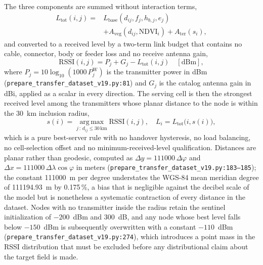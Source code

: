 The three components are summed without interaction terms,
\begin{equation}
\begin{split}
L_{\mathrm{tot}}(i,j) = {}& L_{\mathrm{base}}(d_{ij}, f_{j}, h_{b,j}, e_{j}) \\
 & + A_{\mathrm{veg}}(d_{ij}, \mathrm{NDVI}_{i})
   + A_{\mathrm{ter}}(s_{i}) ,
\end{split}
\label{eq:app-ltot}
\end{equation}
and converted to a received level by a two-term link budget that contains
no cable, connector, body or feeder loss and no receive antenna gain,
\begin{equation}
\mathrm{RSSI}(i,j) = P_{j} + G_{j} - L_{\mathrm{tot}}(i,j)
\quad [\mathrm{dBm}] ,
\label{eq:app-rssi}
\end{equation}
where $P_{j}=10\log_{10}(1000\,P_{j}^{\mathrm{W}})$ is the transmitter power
in dBm (\texttt{prepare\_\allowbreak{}transfer\_\allowbreak{}dataset\_\allowbreak{}v19.py:\allowbreak{}81}) and $G_{j}$ is the
catalog antenna gain in dBi, applied as a scalar in every direction. The
serving cell is then the strongest received level among the transmitters
whose planar distance to the node is within the 30~km inclusion radius,
\begin{equation}
s(i) = \!\!\operatorname*{arg\,max}_{j \,:\, d_{ij} \le 30\,\mathrm{km}}\!\!
\mathrm{RSSI}(i,j),
\quad
L_{i} = L_{\mathrm{tot}}\bigl(i, s(i)\bigr) ,
\label{eq:app-serving}
\end{equation}
which is a pure best-server rule with no handover hysteresis, no load
balancing, no cell-selection offset and no minimum-received-level
qualification. Distances are planar rather than geodesic, computed as
$\Delta y = 111000\,\Delta\varphi$ and
$\Delta x = 111000\,\Delta\lambda\cos\varphi$ in meters
(\texttt{prepare\_\allowbreak{}transfer\_\allowbreak{}dataset\_\allowbreak{}v19.py:\allowbreak{}183--185}); the constant
111000~m per degree understates the WGS-84 mean meridian degree of
111194.93~m by 0.175\,\%, a bias that is negligible against the decibel
scale of the model but is nonetheless a systematic contraction of every
distance in the dataset. Nodes with no transmitter inside the radius retain
the sentinel initialization of $-200$~dBm and 300~dB, and any node whose
best level falls below $-150$~dBm is subsequently overwritten with a
constant $-110$~dBm (\texttt{prepare\_\allowbreak{}transfer\_\allowbreak{}dataset\_\allowbreak{}v19.py:\allowbreak{}274}),
which introduces a point mass in the RSSI distribution that must be
excluded before any distributional claim about the target field is made.


